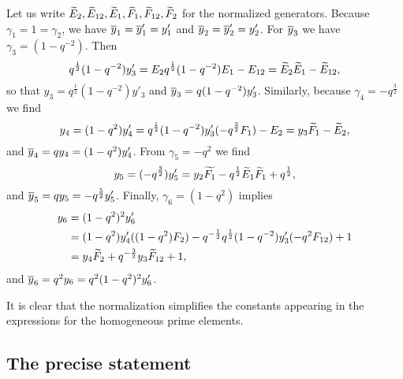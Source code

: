 \begin{example}
	Let us write $\widetilde{E}_2, \widetilde{E}_{12}, \widetilde{E}_1, \widetilde{F}_1, \widetilde{F}_{12}, \widetilde{F}_2$ for the
	normalized generators. Because $\gamma_1 = 1 = \gamma_2$, we have $\overline{y}_1 = \overline{y}'_1 =
		y'_1$ and $\overline{y}_2 = \overline{y}'_2 = y'_2$. For $\overline{y}_3$ we have $\gamma_3 = (1 - q^{-2})$. Then
	\begin{equation*}
		q^{\frac{1}{2}}(1-q^{-2})y'_3 = E_2 q^{\frac{1}{2}}(1-q^{-2})E_1 - E_{12} = \widetilde{E}_2\widetilde{E}_1 - \widetilde{E}_{12},
	\end{equation*}
	so that $y_3 = q^{\frac{1}{2}}(1-q^{-2})y'_3$ and $\overline{y}_3 = q(1 -q^{-2})y'_3$. Similarly, because $\gamma_4 = -q^{\frac{3}{2}}$ we find
	\begin{equation*}
		y_4 = (1-q^2)y'_4 = q^{\frac{1}{2}}(1-q^{-2})y'_3 (-q^{\frac{3}{2}}F_1) - E_2 = y_3 \widetilde{F}_1 - \widetilde{E}_2,
	\end{equation*}
	and $\overline{y}_4 = q y_4 = (1-q^2)y'_4$. From $\gamma_5 = -q^2$ we find
	\begin{equation*}
		y_5 = (-q^{\frac{3}{2}})y'_5 = y_2\widetilde{F_1} -q^{\frac{1}{2}} \widetilde{E}_1\widetilde{F}_1 + q^{\frac{1}{2}},
	\end{equation*}
	and $\overline{y}_5 = q y_5 = -q^{\frac{5}{2}} y'_5$. Finally, $\gamma_6 = (1-q^2)$ implies
	\begin{align*}
		y_6 & = (1-q^2)^2 y'_6                                                                          \\
		    & = (1-q^2)y'_4 ((1-q^2)F_2) - q^{-\frac{1}{2}}q^{\frac{1}{2}}(1-q^{-2})y'_3(-q^2F_{12}) +1 \\
		    & = y_4\widetilde{F}_2 + q^{-\frac{3}{2}}y_3\widetilde{F}_{12} + 1,
	\end{align*}
	and $\overline{y}_6 = q^2 y_6 = q^2(1-q^2)^2 y'_6$.

	It is clear that the normalization simplifies the constants appearing in the
	expressions for the homogeneous prime elements.
\end{example}

\subsection{The precise statement}

